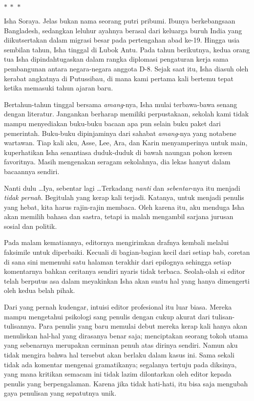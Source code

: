 \documentclass[smalldemyvopaper,11pt,twoside,onecolumn,openright,extrafontsizes]{memoir}
\newcommand\separator{
  \begin{center}
    \(\ast~\ast~\ast\)
  \end{center}
}
\begin{document}
\separator{}

\noindent Isha Soraya. Jelas bukan nama seorang putri pribumi. Ibunya berkebangsaan Bangladesh, sedangkan leluhur ayahnya berasal dari keluarga buruh India yang diikutsertakan dalam migrasi besar pada pertengahan abad ke-19. Hingga usia sembilan tahun, Isha tinggal di Lubok Antu. Pada tahun berikutnya, kedua orang tua Isha dipindahtugaskan dalam rangka diplomasi pengaturan kerja sama pembangunan antara negara-negara anggota D-8. Sejak saat itu, Isha diasuh oleh kerabat angkatnya di Putussibau, di mana kami pertama kali bertemu tepat ketika memasuki tahun ajaran baru.



Bertahun-tahun tinggal bersama \textit{amang}-nya, Isha mulai terbawa-bawa senang dengan literatur. Jangankan berharap memiliki perpustakaan, sekolah kami tidak mampu menyediakan buku-buku bacaan apa pun selain buku paket dari pemerintah. Buku-buku dipinjaminya dari sahabat \textit{amang}-nya yang notabene wartawan. Tiap kali aku, Asse, Lee, Ara, dan Karin menyamperinya untuk main, kuperhatikan Isha senantiasa duduk-duduk di bawah naungan pohon kersen favoritnya. Masih mengenakan seragam sekolahnya, dia lekas hanyut dalam bacaannya sendiri.

Nanti dulu \dots Iya, sebentar lagi \dots Terkadang \textit{nanti} dan \textit{sebentar}-nya itu menjadi \textit{tidak pernah}. Begitulah yang kerap kali terjadi. Katanya, untuk menjadi penulis yang hebat, kita harus rajin-rajin membaca. Oleh karena itu, aku menduga Isha akan memilih bahasa dan sastra, tetapi ia malah mengambil sarjana jurusan sosial dan politik.

Pada malam kematiannya, editornya mengirimkan drafnya kembali melalui faksimile untuk diperbaiki. Kecuali di bagian-bagian kecil dari setiap bab, coretan di sana sini memenuhi satu halaman terakhir dari epilognya sehingga setiap komentarnya bahkan ceritanya sendiri nyaris tidak terbaca. Seolah-olah si editor telah berputus asa dalam meyakinkan Isha akan suatu hal yang hanya dimengerti oleh kedua belah pihak.


Dari yang pernah kudengar, intuisi editor profesional itu luar biasa. Mereka mampu mengetahui psikologi sang penulis dengan cukup akurat dari tulisan-tulisannya. Para penulis yang baru memulai debut mereka kerap kali hanya akan menuliskan hal-hal yang dirasanya benar saja; menciptakan seorang tokoh utama yang sebenarnya merupakan cerminan penuh atas dirinya sendiri. Namun aku tidak mengira bahwa hal tersebut akan berlaku dalam kasus ini. Sama sekali tidak ada komentar mengenai gramatikanya; segalanya tertuju pada diksinya, yang mana kritikan semacam ini tidak lazim dilontarkan oleh editor kepada penulis yang berpengalaman. Karena jika tidak hati-hati, itu bisa saja mengubah gaya penulisan yang sepatutnya unik.
\end{document}
